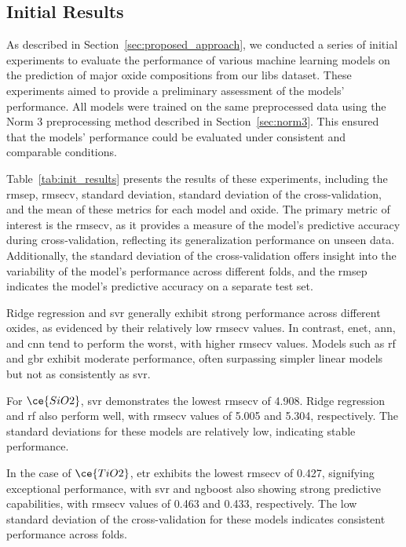 \subsection{Initial Results}
As described in Section~\ref{sec:proposed_approach}, we conducted a series of initial experiments to evaluate the performance of various machine learning models on the prediction of major oxide compositions from our \gls{libs} dataset.
These experiments aimed to provide a preliminary assessment of the models' performance.
All models were trained on the same preprocessed data using the Norm 3 preprocessing method described in Section~\ref{sec:norm3}.
This ensured that the models' performance could be evaluated under consistent and comparable conditions.

Table~\ref{tab:init_results} presents the results of these experiments, including the \gls{rmsep}, \gls{rmsecv}, standard deviation, standard deviation of the cross-validation, and the mean of these metrics for each model and oxide.
The primary metric of interest is the \gls{rmsecv}, as it provides a measure of the model's predictive accuracy during cross-validation, reflecting its generalization performance on unseen data.
Additionally, the standard deviation of the cross-validation offers insight into the variability of the model's performance across different folds, and the \gls{rmsep} indicates the model's predictive accuracy on a separate test set.

Ridge regression and \gls{svr} generally exhibit strong performance across different oxides, as evidenced by their relatively low \gls{rmsecv} values.
In contrast, \gls{enet}, \gls{ann}, and \gls{cnn} tend to perform the worst, with higher \gls{rmsecv} values.
Models such as \gls{rf} and \gls{gbr} exhibit moderate performance, often surpassing simpler linear models but not as consistently as \gls{svr}.

For $\ce{SiO2}$, \gls{svr} demonstrates the lowest \gls{rmsecv} of 4.908.
Ridge regression and \gls{rf} also perform well, with \gls{rmsecv} values of 5.005 and 5.304, respectively.
The standard deviations for these models are relatively low, indicating stable performance.

In the case of $\ce{TiO2}$, \gls{etr} exhibits the lowest \gls{rmsecv} of 0.427, signifying exceptional performance, with \gls{svr} and \gls{ngboost} also showing strong predictive capabilities, with \gls{rmsecv} values of 0.463 and 0.433, respectively.
The low standard deviation of the cross-validation for these models indicates consistent performance across folds.

